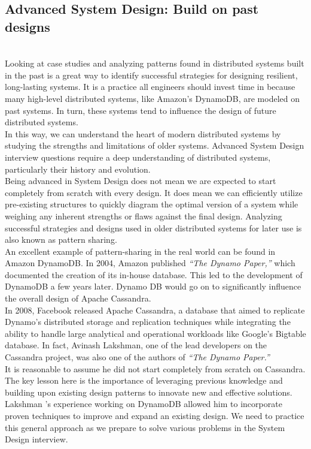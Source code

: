 \subsection{Advanced System Design: Build on past designs}\label{N1QfxvZ3K-GJt8LR7sKND}
\\
Looking at case studies and analyzing patterns found in distributed systems built in the past is a great way to identify successful strategies for designing resilient, long-lasting systems. It is a practice all engineers should invest time in because many high-level distributed systems, like Amazon's DynamoDB, are modeled on past systems. In turn, these systems tend to influence the design of future distributed systems.
\\
In this way, we can understand the heart of modern distributed systems by studying the strengths and limitations of older systems. Advanced System Design interview questions require a deep understanding of distributed systems, particularly their history and evolution.
\\
Being advanced in System Design does not mean we are expected to start completely from scratch with every design. It does mean we can efficiently utilize pre-existing structures to quickly diagram the optimal version of a system while weighing any inherent strengths or flaws against the final design. Analyzing successful strategies and designs used in older distributed systems for later use is also known as pattern sharing.
\\
An excellent example of pattern-sharing in the real world can be found in Amazon DynamoDB. In 2004, Amazon published \emph{``The Dynamo Paper,''} which documented the creation of its in-house database. This led to the development of DynamoDB a few years later. Dynamo
DB would go on to significantly influence the overall design of Apache Cassandra.
\\
In 2008, Facebook released Apache Cassandra, a database that aimed to replicate Dynamo's distributed storage and replication techniques while integrating the ability to handle large analytical and operational workloads like Google's Bigtable database. In fact, Avinash Lakshman, one of the lead developers on the Cassandra project, was also one of the authors of \emph{``The Dynamo Paper.''}
\\
It is reasonable to assume he did not start completely from scratch on Cassandra.
\\
The key lesson here is the importance of leveraging previous knowledge and building upon existing design patterns to innovate new and effective solutions. Lakshman 's experience working on DynamoDB allowed him to incorporate proven techniques to improve and expand an existing design. We need to practice this general approach as we prepare to solve various problems in the System Design interview.

